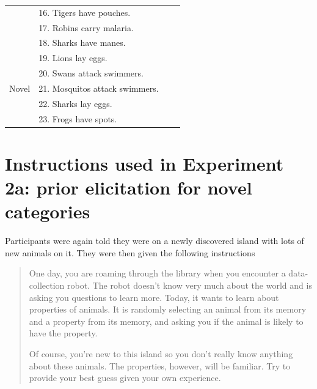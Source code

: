 \documentclass[10pt,letterpaper]{article}
\begin{document}
\begin{table}[h]
\begin{tabular}{| l || l | l | l |}
                                              & 16.  Tigers have pouches.                       &                &                     \\
                                              & 17.  Robins carry malaria.                       &                &                     \\
                                              & 18. Sharks have manes.                       &                &                     \\
                                              & 19. Lions lay eggs.                       &                &                     \\
                                              & 20. Swans attack swimmers.                       &                &                     \\
Novel                         & 21. Mosquitos attack swimmers.       &                &                    \\
                         & 22. Sharks lay eggs.       &                &                    \\
                         & 23. Frogs have spots.       &                &                   \\
\hline

\end{tabular}
\end{table}

\section{Instructions used in Experiment 2a: prior elicitation for novel categories}
\label{sec:prior2instruct}

Participants were again told they were on a newly discovered island with lots of new animals on it. They were then given the following instructions

\begin{quote}
One day, you are roaming through the library when you encounter a data-collection robot. The robot doesn't know very much about the world and is asking you questions to learn more. Today, it wants to learn about properties of animals. It is randomly selecting an animal from its memory and a property from its memory, and asking you if the animal is likely to have the property.

Of course, you're new to this island so you don't really know anything about these animals. The properties, however, will be familiar. Try to provide your best guess given your own experience.
\end{quote}
\end{document}
